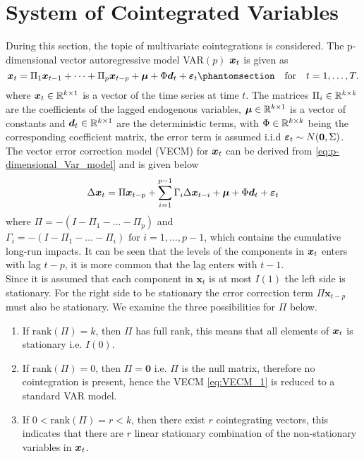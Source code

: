 \section{System of Cointegrated Variables}
During this section, the topic of multivariate cointegrations is considered. The p-dimensional vector autoregressive model VAR$(p)$ $\boldsymbol{x}_t$ is given as
\begin{equation}
    \boldsymbol{x}_t=\Pi_1 \b{x}_{t-1} + \dots + \Pi_p \b{x}_{t-p} + \b{\mu} + \Phi \boldsymbol{d}_t +\boldsymbol{\varepsilon}_t \phantomsection \:\:\: \text{ for } \:\:\: t=1,\dots,T.
    \label{eq:p-dimensional_Var_model}
\end{equation}
where $\boldsymbol{x}_t \in \mathbb{R}^{k\times 1}$ is a vector of the time series at time $t$. The matrices $\Pi_i\in \mathbb{R}^{k\times k}$ are the coefficients of the lagged endogenous variables, $\boldsymbol{\mu} \in \mathbb{R}^{k\times 1}$ is a vector of constants and $\boldsymbol{d}_t \in \mathbb{R}^{k\times 1}$ are the deterministic terms, with $\Phi \in \mathbb{R}^{k\times k}$ being the corresponding coefficient matrix, the error term is assumed i.i.d $\boldsymbol{\varepsilon}_t \sim N(\boldsymbol{0},\Sigma)$. The vector error correction model (VECM) for $\boldsymbol{x}_t$ can be derived from \eqref{eq:p-dimensional_Var_model} and is given below
\begin{equation}
    \Delta \boldsymbol{x}_t = \Pi \boldsymbol{x}_{t-p} + \sum_{i=1}^{p-1}\Gamma_i\Delta \boldsymbol{x}_{t-i} + \boldsymbol{\mu} + \Phi \boldsymbol{d}_t + \boldsymbol{\varepsilon}_t
    \label{eq:VECM_1}
\end{equation}
where $\Pi=-(I-\Pi_1-\dots-\Pi_p)$ and 
$\Gamma_i=-(I-\Pi_{1}-\dots-\Pi_i) \text{ for } i=1,\dots,p-1$, which contains the cumulative long-run impacts. It can be seen that the levels of the components in $\boldsymbol{x}_t$ enters with lag $t-p$, it is more common that the lag enters with $t-1$.\\
Since it is assumed that each component in $\boldsymbol{x}_t$ is at most $I(1)$ the left side is stationary. For the right side to be stationary the error correction term $\Pi\boldsymbol{x}_{t-p}$ must also be stationary.
We examine the three possibilities for $\Pi$ below.
\begin{enumerate}
    \item If $\text{rank}(\Pi)=k$, then $\Pi$ has full rank, this means that all elements of $\boldsymbol{x}_t$ is stationary i.e. $I(0)$.
    \item If $\text{rank}(\Pi)=0$, then $\Pi=\textbf{0}$ i.e. $\Pi$ is the null matrix, therefore no cointegration is present, hence the VECM \eqref{eq:VECM_1} is reduced to a standard VAR model.
    \item If $0<\text{rank}(\Pi)=r<k$, then there exist $r$ cointegrating vectors, this indicates that there are $r$ linear stationary combination of the non-stationary variables in $\boldsymbol{x}_t$.
\end{enumerate}
